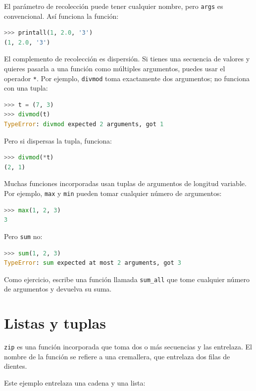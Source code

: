 El parámetro de recolección puede tener cualquier nombre, pero \texttt{args} es convencional. Así funciona la función:

\begin{lstlisting}[language=Python]
>>> printall(1, 2.0, '3')
(1, 2.0, '3')
\end{lstlisting}

El complemento de recolección es dispersión. Si tienes una secuencia de valores y quieres pasarla a una función como múltiples argumentos, puedes usar el operador \texttt{*}. Por ejemplo, \texttt{divmod} toma exactamente dos argumentos; no funciona con una tupla:

\begin{lstlisting}[language=Python]
>>> t = (7, 3)
>>> divmod(t)
TypeError: divmod expected 2 arguments, got 1
\end{lstlisting}

Pero si dispersas la tupla, funciona:

\begin{lstlisting}[language=Python]
>>> divmod(*t)
(2, 1)
\end{lstlisting}

Muchas funciones incorporadas usan tuplas de argumentos de longitud variable. Por ejemplo, \texttt{max} y \texttt{min} pueden tomar cualquier número de argumentos:

\begin{lstlisting}[language=Python]
>>> max(1, 2, 3)
3
\end{lstlisting}

Pero \texttt{sum} no:

\begin{lstlisting}[language=Python]
>>> sum(1, 2, 3)
TypeError: sum expected at most 2 arguments, got 3
\end{lstlisting}

Como ejercicio, escribe una función llamada \texttt{sum\_all} que tome cualquier número de argumentos y devuelva su suma.

\section{Listas y tuplas}

\texttt{zip} es una función incorporada que toma dos o más secuencias y las entrelaza. El nombre de la función se refiere a una cremallera, que entrelaza dos filas de dientes.

Este ejemplo entrelaza una cadena y una lista:

